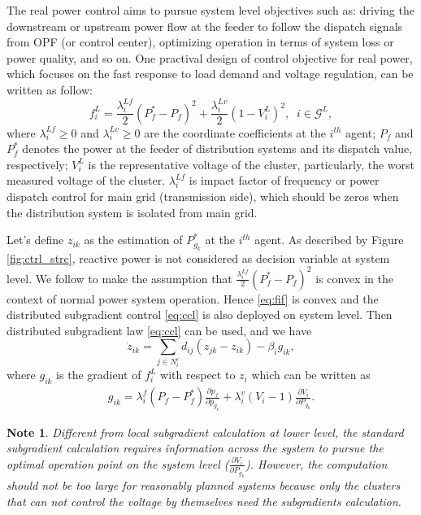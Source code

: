 \documentclass{article}
\newtheorem{note}{Note}[section]
\begin{document}
The real power control aims to pursue system level objectives such as: driving the downstream or upstream power flow at the feeder to follow the dispatch signals from OPF (or control center), optimizing operation in terms of system loss or power quality, and so on. One practival design of control objective for real power, which focuses on the fast response to load demand and voltage regulation, can be written as follow:
\begin{equation}
    f^L_i =
    \frac{\lambda^{Lf}_i}{2}(P_{f}^{*}-P_{f})^2+\frac{\lambda^{Lv}_i}{2}(1-V^L_{i})^2
    ,\;\;i\in \mathcal{G}^L,\label{eq:fif}
\end{equation}
where $\lambda_i^{Lf}\geq 0$ and $\lambda^{Lv}_i\geq 0$ are the coordinate coefficients at the $i^{th}$ agent; $P_{f}$ and $P_{f}^{*}$ denotes the power at the feeder of distribution systems and its dispatch value, respectively; $V^L_{i}$ is the representative voltage of the cluster, particularly, the worst measured voltage of the cluster.
$\lambda_i^{Lf}$ is impact factor of frequency or power dispatch control for main grid (transmission side), which should be zeros when the distribution system is isolated from main grid. 

Let's define $z_{ik}$ as the estimation of $P^{*}_{g_k}$ at the $i^{th}$ agent. As described by Figure \ref{fig:ctrl_strc}, reactive power is not considered as decision variable at system level. 
We follow \cite{gan2016online} to make the assumption that $\frac{\lambda^{Lf}_i}{2}(P_{f}^{*}-P_{f})^2$ is convex in the context of normal power system operation. Hence \eqref{eq:fif} is convex and the distributed subgradient control \eqref{eq:ccl} is also deployed on system level.
Then distributed subgradient law \eqref{eq:ccl} can be used, and we have
\begin{equation}
    \dot z_{ik} = \sum_{j\in N_i^c}d_{ij} (z_{jk}-z_{ik})-\beta_ig_{ik},\label{eq:cclz}
\end{equation}
where $g_{ik}$ is the gradient of $f^L_i$ with respect to $z_i$ which can be written as
\begin{equation}
 \begin{split}
g_{ik}=\lambda^f_i(P_f-P^*_f)\frac{\partial p_{f}}{\partial p_{g_k}}+\lambda^v_i( V_i-1)\frac{\partial V_i}{\partial P_{g_k}}.
 \end{split}   \label{eq:gik}
\end{equation}

\begin{note}
Different from local subgradient calculation at lower level, the standard subgradient calculation requires information across the system to pursue the optimal operation point on the system level ($\frac{\partial V_i}{\partial P_{g_k}}$). However, the computation should not be too large for reasonably planned systems because only the clusters that can not control the voltage by themselves need the subgradients calculation.
\end{note}
\end{document}
